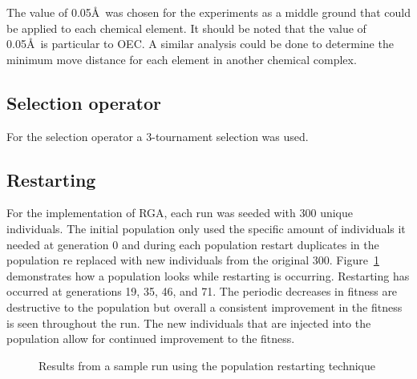 \documentclass[conference]{IEEEtran}
\begin{document}
The value of 0.05\AA\ was chosen for the experiments as a middle ground that could be applied to each chemical element. It should be noted that the value of 0.05\AA\ is particular to OEC. A similar analysis could be done to determine the minimum move distance for each element in another chemical complex.

\subsection{Selection operator}

For the selection operator a 3-tournament selection was used.

\subsection{Restarting}
\label{subsec:restarting}

For the implementation of RGA, each run was seeded with 300 unique individuals. The initial population only used the specific amount of individuals it needed at generation 0 and during each population restart duplicates in the population re replaced with new individuals from the original 300. Figure~\ref{fig:bestRunRestarting} demonstrates how a population looks while restarting is occurring. Restarting has occurred at generations 19, 35, 46, and 71. The periodic decreases in fitness are destructive to the population but overall a consistent improvement in the fitness is seen throughout the run. The new individuals that are injected into the population allow for continued improvement to the fitness.

\begin{figure}
\caption{Results from a sample run using the population restarting technique}
\label{fig:bestRunRestarting}
\begin{center}
\end{center}
\end{figure}
\end{document}
